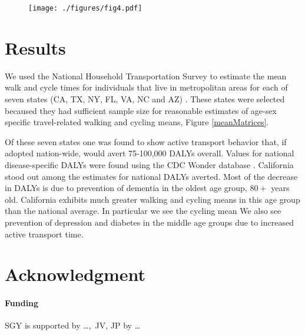 \documentclass{bioinfo}
\begin{document}
\begin{figure}[t]
  \centerline{\texttt{[image: ./figures/fig4.pdf]}}
    \caption{}\label{California}
\end{figure}

\section{Results}

We used the National Household Transportation Survey to estimate the
mean walk and cycle times for individuals that live in metropolitan
areas for each of seven states (CA, TX, NY, FL, VA, NC and AZ)
\cite{NHTS}.  These states were selected becaused they had sufficient
sample size for reasonable estimates of age-sex specific
travel-related walking and cycling means, Figure \ref{meanMatrices}.

Of these seven states one was found to show active transport behavior
that, if adopted nation-wide, would avert 75-100,000 DALYs overall.
Values for national disease-specific DALYs were found using the CDC
Wonder database \cite{CDCWonder}.  California stood out among the
estimates for national DALYs averted.  Most of the decrease in DALYs
is due to prevention of dementia in the oldest age group, $80+$ years
old.  California exhibits much greater walking and cycling means in
this age group than the national average. In particular we see the
cycling mean We also see prevention of depression and diabetes in the
middle age groups due to increased active transport time.

\section*{Acknowledgment}
\paragraph{Funding\textcolon} SGY is supported by \ldots,\ JV, JP by \ldots

%

%

\end{document}
